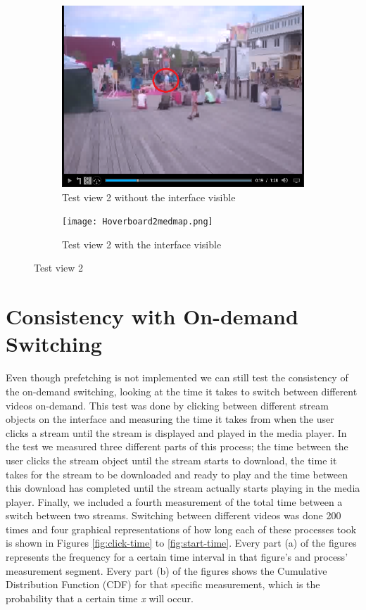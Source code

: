 \begin{figure}
\begin{subfigure}[b]{0.5\textwidth}
 	\includegraphics[width=\linewidth]{Hoverboard_2.png}
  	\caption{Test view 2 without the interface visible}\label{fig:testview2A}
    \end{subfigure}\hfill 
    \hspace{3px}
    \begin{subfigure}[b]{0.5\textwidth}
	 \texttt{[image: Hoverboard2medmap.png]}
 	\caption{Test view 2 with the interface visible}\label{fig:testview2B}
    \end{subfigure}
	\caption{Test view 2}
	\label{fig:testview2}
\end{figure}

\section{Consistency with On-demand Switching}
Even though prefetching is not implemented we can still test the consistency of the on-demand switching, looking at the time it takes to switch between different videos on-demand. This test was done by clicking between different stream objects on the interface and measuring the time it takes from when the user clicks a stream until the stream is displayed and played in the media player. In the test we measured three different parts of this process; the time between the user clicks the stream object until the stream starts to download, the time it takes for the stream to be downloaded and ready to play and the time between this download has completed until the stream actually starts playing in the media player. Finally, we included a fourth measurement of the total time between a switch between two streams. Switching between different videos was done 200 times and four graphical representations of how long each of these processes took is shown in Figures \ref{fig:click-time} to \ref{fig:start-time}. Every part (a) of the figures represents the frequency for a certain time interval in that figure's and process’ measurement segment. Every part (b) of the figures shows the Cumulative Distribution Function (CDF) for that specific measurement, which is the probability that a certain time \textit{x} will occur.

